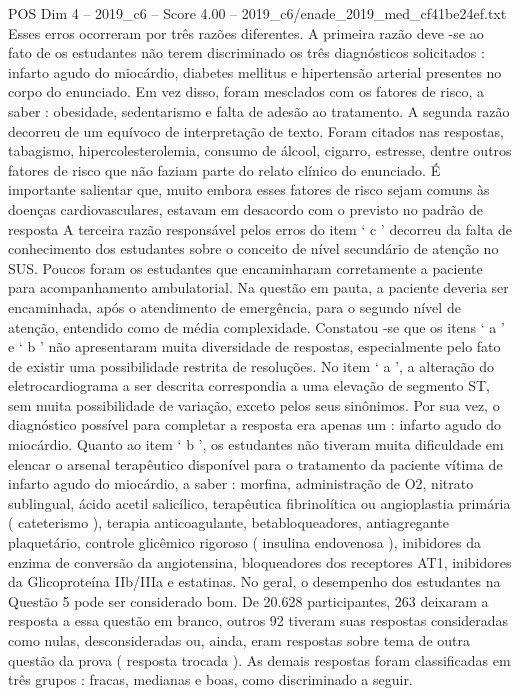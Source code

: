 \begin{textsample}{POS Dim 4 – 2019\_c6 – Score 4.00 – 2019\_c6/enade\_2019\_med\_cf41be24ef.txt}
Esses erros ocorreram por três razões diferentes.
A primeira razão deve -se ao fato de os estudantes não terem discriminado os três diagnósticos solicitados : infarto agudo do miocárdio, diabetes mellitus e hipertensão arterial presentes no corpo do enunciado.
Em vez disso, foram mesclados com os fatores de risco, a saber : obesidade, sedentarismo e falta de adesão ao tratamento.
A segunda razão decorreu de um equívoco de interpretação de texto.
Foram citados nas respostas, tabagismo, hipercolesterolemia, consumo de álcool, cigarro, estresse, dentre outros fatores de risco que não faziam parte do relato clínico do enunciado.
É importante salientar que, muito embora esses fatores de risco sejam comuns às doenças cardiovasculares, estavam em desacordo com o previsto no padrão de resposta A terceira razão responsável pelos erros do item ‘ c ’ decorreu da falta de conhecimento dos estudantes sobre o conceito de nível secundário de atenção no SUS.
Poucos foram os estudantes que encaminharam corretamente a paciente para acompanhamento ambulatorial.
Na questão em pauta, a paciente deveria ser encaminhada, após o atendimento de emergência, para o segundo nível de atenção, entendido como de média complexidade.
Constatou -se que os itens ‘ a ’ e ‘ b ’ não apresentaram muita diversidade de respostas, especialmente pelo fato de existir uma possibilidade restrita de resoluções.
No item ‘ a ’, a alteração do eletrocardiograma a ser descrita correspondia a uma elevação de segmento ST, sem muita possibilidade de variação, exceto pelos seus sinônimos.
Por sua vez, o diagnóstico possível para completar a resposta era apenas um : infarto agudo do miocárdio.
Quanto ao item ‘ b ’, os estudantes não tiveram muita dificuldade em elencar o arsenal terapêutico disponível para o tratamento da paciente vítima de infarto agudo do miocárdio, a saber : morfina, administração de O2, nitrato sublingual, ácido acetil salicílico, terapêutica fibrinolítica ou angioplastia primária ( cateterismo ), terapia anticoagulante, betabloqueadores, antiagregante plaquetário, controle glicêmico rigoroso ( insulina endovenosa ), inibidores da enzima de conversão da angiotensina, bloqueadores dos receptores AT1, inibidores da Glicoproteína IIb/IIIa e estatinas.
No geral, o desempenho dos estudantes na Questão 5 pode ser considerado bom.
De 20.628 participantes, 263 deixaram a resposta a essa questão em branco, outros 92 tiveram suas respostas consideradas como nulas, desconsideradas ou, ainda, eram respostas sobre tema de outra questão da prova ( resposta trocada ).
As demais respostas foram classificadas em três grupos : fracas, medianas e boas, como discriminado a seguir.

\end{textsample}
